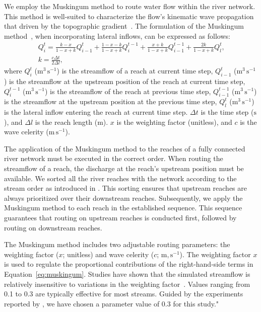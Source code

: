 \documentclass[draft]{agujournal2019}
\begin{document}
We employ the Muskingum method to route water flow within the river network. This method is well-suited to characterize the flow's kinematic wave propagation that driven by the topographic gradient~\cite{ponce1978JHD}. The formulation of the Muskingum method~\cite{cunge1969JHD, fenton2019JH}, when incorporating lateral inflows, can be expressed as follows:
\begin{eqnarray}
      Q_{i}^{t} = \frac{k - x}{1 - x + k} Q_{i-1}^{t} + \frac{1 - x - k}{1 - x + k} Q_{i}^{t-1} + \frac{x + k}{1 - x + k} Q_{i-1}^{t-1} + \frac{2k}{1 - x + k} Q_l^t \textrm{,} \label{eq:muskingum}\\
      k  = \frac{c \Delta t} {2 \Delta l} \textrm{,}
\end{eqnarray}
where $Q_{i}^{t}$ ($\textrm{m}^3\,\textrm{s}^{-1}$) is the streamflow of a reach at current time step, $Q_{i-1}^{t}$ ($\textrm{m}^3\,\textrm{s}^{-1}$) is the streamflow at the upstream position of the reach at current time step, $Q_{i}^{t-1}$ ($\textrm{m}^3\,\textrm{s}^{-1}$) is the streamflow of the reach at previous time step, $Q_{i-1}^{t-1}$ ($\textrm{m}^3\,\textrm{s}^{-1}$) is the streamflow at the upstream position at the previous time step, $Q_l^t$ ($\textrm{m}^3\,\textrm{s}^{-1}$) is the lateral inflow entering the reach at current time step. $\Delta t$ is the time step ($\textrm{s}$), and $\Delta l$ is the reach length ($\textrm{m}$). $x$ is the weighting factor (unitless), and $c$ is the wave celerity ($\textrm{m}\,\textrm{s}^{-1}$).

The application of the Muskingum method to the reaches of a fully connected river network must be executed in the correct order. When routing the streamflow of a reach, the discharge at the reach's upstream position must be available. We sorted all the river reaches with the network according to the stream order as introduced in \cite{yang2024W}. This sorting ensures that upstream reaches are always prioritized over their downstream reaches. Subsequently, we apply the Muskingum method to each reach in the established sequence. This sequence guarantees that routing on upstream reaches is conducted first, followed by routing on downstream reaches.

The Muskingum method includes two adjustable routing parameters: the weighting factor ($x$; unitless) and wave celerity ($c$; $\textrm{m},\textrm{s}^{-1}$). The weighting factor $x$ is used to regulate the proportional contributions of the right-hand-side terms in Equation~\ref{eq:muskingum}. Studies have shown that the simulated streamflow is relatively insensitive to variations in the weighting factor~\cite{koussis1978JHD}. Values ranging from 0.1 to 0.3 are typically effective for most streams. Guided by the experiments reported by , we have chosen a parameter value of 0.3 for this study."
\end{document}
